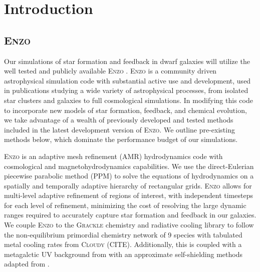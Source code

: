 \documentclass[12pt]{article}
\begin{document}
\maketitle

\section{Introduction}

\subsection{\textsc{Enzo}}

Our simulations of star formation and feedback in dwarf galaxies will utilize the well tested and publicly available \textsc{Enzo} \citep{Enzo-method}. \textsc{Enzo} is a community driven astrophysical simulation code with substantial active use and development, used in publications studying a wide variety of astrophysical processes, from isolated star clusters and galaxies to full cosmological simulations. In modifying this code to incorporate new models of star formation, feedback, and chemical evolution, we take advantage of a wealth of previously developed and tested methods included in the latest development version of \textsc{Enzo}. We outline pre-existing methods below, which dominate the performance budget of our simulations. 

\textsc{Enzo} is an adaptive mesh refinement (AMR) hydrodynamics code with cosmological and magnetohydrodynamics capabilities. We use the direct-Eulerian piecewise parabolic method (PPM) \citep{ColellaWoodward1984, Bryan1995} to solve the equations of hydrodynamics on a spatially and temporally adaptive hierarchy of rectangular grids. \textsc{Enzo} allows for multi-level adaptive refinement of regions of interest, with independent timesteps for each level of refinement, minimizing the cost of resolving the large dynamic ranges required to accurately capture star formation and feedback in our galaxies. We couple \textsc{Enzo} to the \textsc{Grackle} chemistry and radiative cooling library to follow the non-equilibrium primordial chemistry network of 9 species with tabulated metal cooling rates from \textsc{Cloudy} (CITE). Additionally, this is coupled with a metagalctic UV background from \cite{HM2012} with an approximate self-shielding methods adapted from \cite{XX}.  
\end{document}
